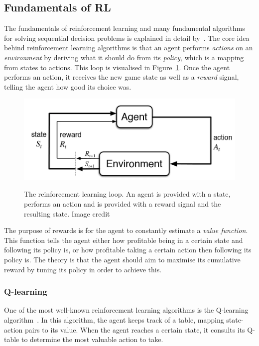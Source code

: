 \documentclass[12pt,a4paper]{article}
\begin{document}
    \subsection{Fundamentals of RL}\label{subsec:fundamentals}
    The fundamentals of reinforcement learning and many fundamental algorithms for solving sequential decision problems is explained in detail by~\citet{sutton18}.
    The core idea behind reinforcement learning algorithms is that an agent performs \emph{actions} on an \emph{environment} by deriving what it should do from its \emph{policy}, which is a mapping from states to actions.
    This loop is visualised in Figure~\ref{fig:rlgraph}.
    Once the agent performs an action, it receives the new game state as well as a \emph{reward} signal, telling the agent how good its choice was.

    \begin{figure}[ht]
        \caption[The reinforcement learning loop.]{The reinforcement learning loop. An agent is provided with a state, performs an action and is provided with a reward signal and the resulting state. Image credit~\citet{bhattrl}}
        \centering
        \includegraphics[scale=0.4]{rlgraph}
        \label{fig:rlgraph}
    \end{figure}

    The purpose of rewards is for the agent to constantly estimate a \emph{value function}.
    This function tells the agent either how profitable being in a certain state and following its policy is, or how profitable taking a certain action then following its policy is.
    The theory is that the agent should aim to maximise its cumulative reward by tuning its policy in order to achieve this.

    \subsubsection{Q-learning}
    One of the most well-known reinforcement learning algorithms is the Q-learning algorithm~\citep[chap.~6.5]{sutton18}.
    In this algorithm, the agent keeps track of a table, mapping state-action pairs to its value.
    When the agent reaches a certain state, it consults its Q-table to determine the most valuable action to take.
\end{document}
